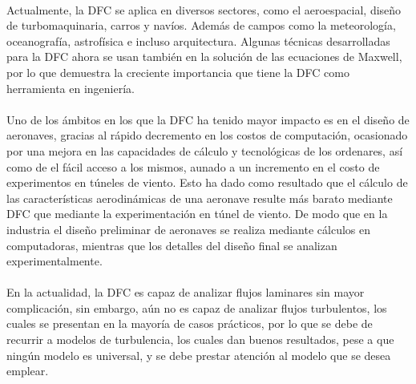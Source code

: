\documentclass[letterpaper, openright, 12pt]{book}
\begin{document}
            \paragraph*{}
                Actualmente, la DFC se aplica en diversos sectores, como el
                aeroespacial, diseño de turbomaquinaria, carros y navíos. Además
                de campos como la meteorología, oceanografía, astrofísica e
                incluso arquitectura. Algunas técnicas desarrolladas para la DFC
                ahora se usan también en la solución de las ecuaciones de
                Maxwell, por lo que demuestra la creciente importancia que tiene
                la DFC como herramienta en ingeniería.\cite{blazek}

            \paragraph*{}
                Uno de los ámbitos en los que la DFC ha tenido mayor impacto es
                en el diseño de aeronaves, gracias al rápido decremento en los
                costos de computación, ocasionado por una mejora en las
                capacidades de cálculo y tecnológicas de los ordenares, así como
                de el fácil acceso a los mismos, aunado a un incremento en el
                costo de experimentos en túneles de viento. Esto ha dado como
                resultado que el cálculo de las características aerodinámicas de
                una aeronave resulte más barato mediante DFC que mediante la
                experimentación en túnel de viento. De modo que en la industria
                el diseño preliminar de aeronaves se realiza mediante cálculos
                en computadoras, mientras que los detalles del diseño final se
                analizan experimentalmente.\cite{anderson-yotros}

            \paragraph*{}
                En la actualidad, la DFC es capaz de analizar flujos laminares
                sin mayor complicación, sin embargo, aún no es capaz de analizar
                flujos turbulentos, los cuales se presentan en la mayoría de
                casos prácticos,  por lo que se debe de recurrir a modelos de
                turbulencia, los cuales dan buenos resultados, pese a que ningún
                modelo es universal, y se debe prestar atención al modelo que se
                desea emplear.\cite{cengel}
\end{document}

